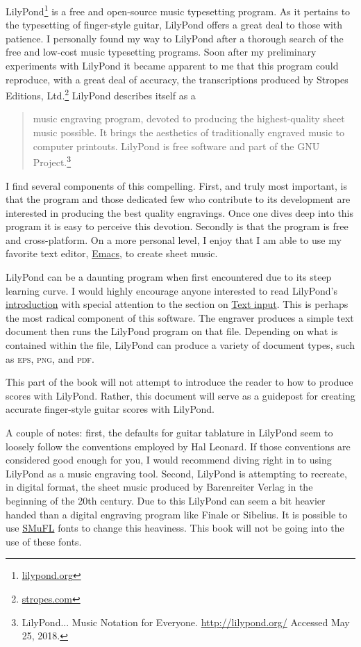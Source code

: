 \documentclass[]{memoir}
\begin{document}
LilyPond\footnote{\url{lilypond.org}} is a free and open-source music
typesetting program. As it pertains to the typesetting of finger-style
guitar, LilyPond offers a great deal to those with patience. I
personally found my way to LilyPond after a thorough search of the
free and low-cost music typesetting programs. Soon after my
preliminary experiments with LilyPond it became apparent to me that
this program could reproduce, with a great deal of accuracy, the
transcriptions produced by Stropes Editions,
Ltd.\footnote{\url{stropes.com}} LilyPond describes itself as a
\begin{quotation}
  \noindent music engraving program, devoted to producing the
  highest-quality sheet music possible.  It brings the aesthetics of
  traditionally engraved music to computer printouts. LilyPond is free
  software and part of the GNU Project.\footnote{LilyPond... Music
    Notation for Everyone. \url{http://lilypond.org/} Accessed May 25,
    2018.}
\end{quotation}
I find several components of this compelling. First, and truly most
important, is that the program and those dedicated few who contribute
to its development are interested in producing the best quality
engravings. Once one dives deep into this program it is easy to
perceive this devotion. Secondly is that the program is free and
cross-platform. On a more personal level, I enjoy that I am able to
use my favorite text editor,
\href{https://www.gnu.org/software/emacs/}{Emacs}, to create sheet
music.

LilyPond can be a daunting program when first encountered due to its
steep learning curve. I would highly encourage anyone interested to
read LilyPond's
\href{http://lilypond.org/introduction.html}{introduction} with
special attention to the section on
\href{http://lilypond.org/text-input.html}{Text input}. This is
perhaps the most radical component of this software. The engraver
produces a simple text document then runs the LilyPond program on that
file. Depending on what is contained within the file, LilyPond can
produce a variety of document types, such as \textsc{eps},
\textsc{png}, and \textsc{pdf}.

This part of the book will not attempt to introduce the reader to how
to produce scores with LilyPond. Rather, this document will serve as a
guidepost for creating accurate finger-style guitar scores with
LilyPond.

A couple of notes: first, the defaults for guitar tablature in
LilyPond seem to loosely follow the conventions employed by Hal
Leonard. If those conventions are considered good enough for you, I
would recommend diving right in to using LilyPond as a music engraving
tool. Second, LilyPond is attempting to recreate, in digital format,
the sheet music produced by Barenreiter Verlag in the beginning of the
20th century. Due to this LilyPond can seem a bit heavier handed than
a digital engraving program like Finale or Sibelius. It is possible to
use \href{https://www.smufl.org/}{SMuFL} fonts to change this
heaviness. This book will not be going into the use of these fonts.
\end{document}
